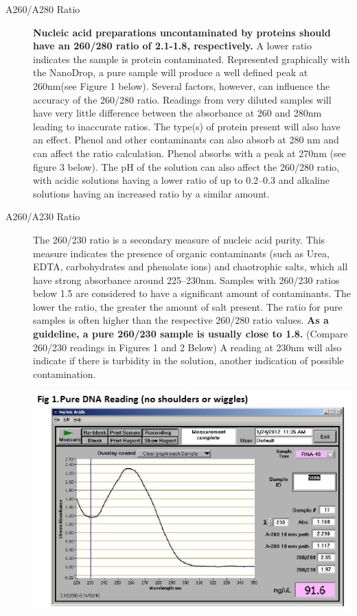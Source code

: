 \documentclass[12pt]{../SOP3_alpha}\usepackage[]{graphicx}\usepackage[]{color}
\begin{document}
\begin{description}
  \item[A260/A280 Ratio] \textbf{Nucleic acid preparations uncontaminated by proteins should have an 260/280 ratio of 2.1-1.8, respectively.} A lower ratio indicates the sample is protein contaminated. Represented graphically with the NanoDrop, a pure sample will produce a well defined peak at 260nm(see Figure 1 below). Several factors, however, can influence the accuracy of the 260/280 ratio. Readings from very diluted samples will have very little difference between the absorbance at 260 and 280nm leading to inaccurate ratios.  The type(s) of protein present will also have an effect. Phenol and other contaminants can also absorb at 280 nm and can affect the ratio calculation. Phenol absorbs with a peak at 270nm (see figure 3 below). The pH of the solution can also affect the 260/280 ratio, with acidic solutions having a lower ratio of up to 0.2--0.3 and alkaline solutions having an increased ratio by a similar amount.
  
  \item[A260/A230 Ratio] The 260/230 ratio is a secondary measure of nucleic acid purity. This measure indicates the presence of organic contaminants (such as Urea, EDTA, carbohydrates and phenolate ions) and chaotrophic salts, which all have strong absorbance around 225--230nm. Samples with 260/230 ratios below 1.5 are considered to have a significant amount of contaminants. The lower the ratio, the greater the amount of salt present. The ratio for pure samples is often higher than the respective 260/280 ratio values. \textbf{As a guideline, a pure 260/230 sample is usually close to 1.8.} (Compare 260/230 readings in Figures 1 and 2 Below)  A reading at 230nm will also indicate if there is turbidity in the solution, another indication of possible contamination.  
  
\includegraphics[scale=1]{NanoDropPure.png}


\end{description}
\end{document}
